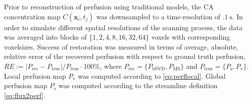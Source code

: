 \documentclass[final,5p,times,twocolumn]{elsarticle}
\begin{document}
	Prior to reconstruction of perfusion using traditional models, the CA concentration map $C(\mathbf{x}_i,t_j)$ was downsampled to a time-resolution of $\SI{.1}{\second}$.
	In order to simulate different spatial resolutions of the scanning process, the data was averaged into blocks of $\{1,2,4,8,16,32,64\}$ voxels with corresponding voxelsizes.
	Success of restoration was measured in terms of average, absolute, relative error of the recovered perfusion with respect to ground truth perfusion, $RE :=  |P_{\mathrm{rec}} - P_{\mathrm{true}}|/P_{\mathrm{true}}\cdot 100\%$, where $P_{\mathrm{rec}} = \{P_{\mathrm{bSVD}},P_{\mathrm{MS}}\}$ and $P_{\mathrm{true}} = \{P_{\mathrm{s}},P_{\mathrm{v}}\}$.
	Local perfusion map $P_{\mathrm{v}}$ was computed according to \eqref{eq:perflocal}. 
	Global perfusion map $P_{\mathrm{s}}$ was computed according to the streamline definition \eqref{eq:flux2perf}.
\end{document}
